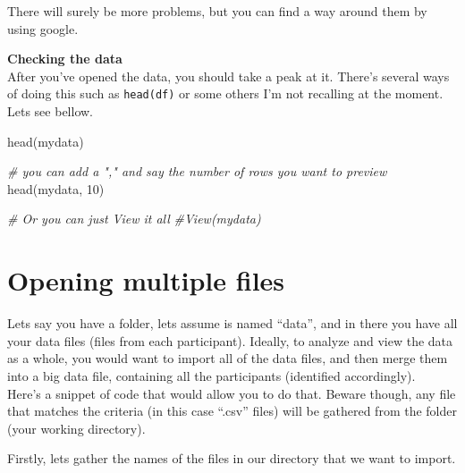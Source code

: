 \documentclass[
]{book}
\newenvironment{Shaded}{\begin{snugshade}}{\end{snugshade}}
\newcommand{\CommentTok}[1]{\textcolor[rgb]{0.56,0.35,0.01}{\textit{#1}}}
\newcommand{\DecValTok}[1]{\textcolor[rgb]{0.00,0.00,0.81}{#1}}
\newcommand{\FunctionTok}[1]{\textcolor[rgb]{0.00,0.00,0.00}{#1}}
\newcommand{\NormalTok}[1]{#1}
\begin{document}
There will surely be more problems, but you can find a way around them by using google.

\textbf{Checking the data}\\
After you've opened the data, you should take a peak at it.
There's several ways of doing this such as \texttt{head(df)} or some others I'm not recalling at the moment.
Lets see bellow.

\begin{Shaded}
\begin{Highlighting}[]
\FunctionTok{head}\NormalTok{(mydata)}

\CommentTok{\# you can add a "," and say the number of rows you want to preview}
\FunctionTok{head}\NormalTok{(mydata, }\DecValTok{10}\NormalTok{) }

\CommentTok{\# Or you can just View it all}
\CommentTok{\#View(mydata)}
\end{Highlighting}
\end{Shaded}

\hypertarget{opening-multiple-files}{%
\section{Opening multiple files}\label{opening-multiple-files}}

Lets say you have a folder, lets assume is named ``data'', and in there you have all your data files (files from each participant).
Ideally, to analyze and view the data as a whole, you would want to import all of the data files, and then merge them into a big data file, containing all the participants (identified accordingly).\\
Here's a snippet of code that would allow you to do that.
Beware though, any file that matches the criteria (in this case ``.csv'' files) will be gathered from the folder (your working directory).

Firstly, lets gather the names of the files in our directory that we want to import.
\end{document}
